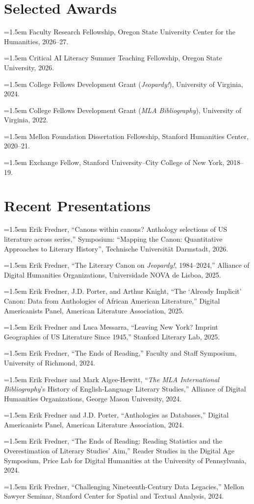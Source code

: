 \documentclass[12pt, letterpaper]{article}
\newcommand{\entry}[1]{\hangindent=1.5em\hangafter=1 #1\par}
\newenvironment{tight}{\setlength{\parskip}{0pt}}{}
\begin{document}
\section{Selected Awards}
\begin{tight}
\entry{Faculty Research Fellowship, Oregon State University Center for the Humanities, 2026--27.}
\entry{Critical AI Literacy Summer Teaching Fellowship, Oregon State University, 2026.}
\entry{College Fellows Development Grant (\textit{Jeopardy!}), University of Virginia, 2024.}
\entry{College Fellows Development Grant (\textit{MLA Bibliography}), University of Virginia, 2022.}
\entry{Mellon Foundation Dissertation Fellowship, Stanford Humanities Center, 2020--21.}
\entry{Exchange Fellow, Stanford University--City College of New York, 2018--19.}
\end{tight}

\section{Recent Presentations}
\entry{Erik Fredner, ``Canons within canons? Anthology selections of US literature across series,'' Symposium: ``Mapping the Canon: Quantitative Approaches to Literary History'', Technische Universität Darmstadt, 2026.}
\entry{Erik Fredner, ``The Literary Canon on \textit{Jeopardy!}, 1984--2024,'' Alliance of Digital Humanities Organizations, Universidade NOVA de Lisboa, 2025.}
\entry{Erik Fredner, J.D. Porter, and Arthur Knight, ``The `Already Implicit' Canon: Data from Anthologies of African American Literature,'' Digital Americanists Panel, American Literature Association, 2025.}
\entry{Erik Fredner and Luca Messarra, ``Leaving New York? Imprint Geographies of US Literature Since 1945,'' Stanford Literary Lab, 2025.}
\entry{Erik Fredner, ``The Ends of Reading,'' Faculty and Staff Symposium, University of Richmond, 2024.}
\entry{Erik Fredner and Mark Algee-Hewitt, ``\textit{The MLA International Bibliography}'s History of English-Language Literary Studies,'' Alliance of Digital Humanities Organizations, George Mason University, 2024.}
\entry{Erik Fredner and J.D. Porter, ``Anthologies as Databases,'' Digital Americanists Panel, American Literature Association, 2024.}
\entry{Erik Fredner, ``The Ends of Reading: Reading Statistics and the Overestimation of Literary Studies' Aim,'' Reader Studies in the Digital Age Symposium, Price Lab for Digital Humanities at the University of Pennsylvania, 2024.}
\entry{Erik Fredner, ``Challenging Nineteenth-Century Data Legacies,'' Mellon Sawyer Seminar, Stanford Center for Spatial and Textual Analysis, 2024.}
\end{document}
